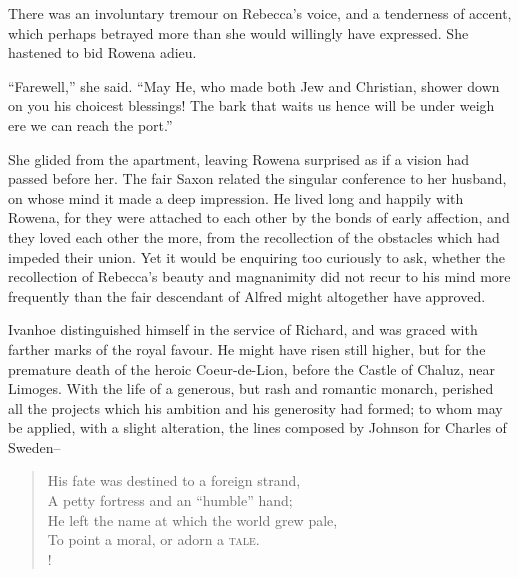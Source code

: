 There was an involuntary tremour on Rebecca's voice, and a tenderness of
accent, which perhaps betrayed more than she would willingly have
expressed. She hastened to bid Rowena adieu.

``Farewell,'' she said. ``May He, who made both Jew and Christian,
shower down on you his choicest blessings! The bark that waits us hence
will be under weigh ere we can reach the port.''

She glided from the apartment, leaving Rowena surprised as if a vision
had passed before her. The fair Saxon related the singular conference to
her husband, on whose mind it made a deep impression. He lived long and
happily with Rowena, for they were attached to each other by the bonds
of early affection, and they loved each other the more, from the
recollection of the obstacles which had impeded their union. Yet it
would be enquiring too curiously to ask, whether the recollection of
Rebecca's beauty and magnanimity did not recur to his mind more
frequently than the fair descendant of Alfred might altogether have
approved.

Ivanhoe distinguished himself in the service of Richard, and was graced
with farther marks of the royal favour. He might have risen still
higher, but for the premature death of the heroic Coeur-de-Lion, before
the Castle of Chaluz, near Limoges. With the life of a generous, but
rash and romantic monarch, perished all the projects which his ambition
and his generosity had formed; to whom may be applied, with a slight
alteration, the lines composed by Johnson for Charles of Sweden--

\begin{verse}
His fate was destined to a foreign strand,\\
A petty fortress and an ``humble'' hand;\\
He left the name at which the world grew pale,\\
To point a moral, or adorn a \textsc{tale}.\\!
\end{verse}
